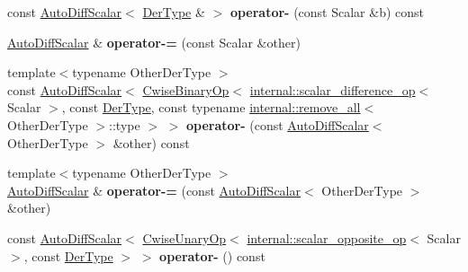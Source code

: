 \begin{DoxyCompactItemize}
\item 
\mbox{\label{class_eigen_1_1_auto_diff_scalar_aff9b4de98ff262aeabd2e965127ab348}} 
const \hyperlink{class_eigen_1_1_auto_diff_scalar}{Auto\+Diff\+Scalar}$<$ \hyperlink{group___sparse_core___module}{Der\+Type} \& $>$ {\bfseries operator-\/} (const Scalar \&b) const
\item 
\mbox{\label{class_eigen_1_1_auto_diff_scalar_a76603d0712d173a59f932237645142ad}} 
\hyperlink{class_eigen_1_1_auto_diff_scalar}{Auto\+Diff\+Scalar} \& {\bfseries operator-\/=} (const Scalar \&other)
\item 
\mbox{\label{class_eigen_1_1_auto_diff_scalar_ab27197e734ceb3cbcfb53f5685dd8ae2}} 
{\footnotesize template$<$typename Other\+Der\+Type $>$ }\\const \hyperlink{class_eigen_1_1_auto_diff_scalar}{Auto\+Diff\+Scalar}$<$ \hyperlink{group___core___module_class_eigen_1_1_cwise_binary_op}{Cwise\+Binary\+Op}$<$ \hyperlink{struct_eigen_1_1internal_1_1scalar__difference__op}{internal\+::scalar\+\_\+difference\+\_\+op}$<$ Scalar $>$, const \hyperlink{group___sparse_core___module}{Der\+Type}, const typename \hyperlink{struct_eigen_1_1internal_1_1remove__all}{internal\+::remove\+\_\+all}$<$ Other\+Der\+Type $>$\+::type $>$ $>$ {\bfseries operator-\/} (const \hyperlink{class_eigen_1_1_auto_diff_scalar}{Auto\+Diff\+Scalar}$<$ Other\+Der\+Type $>$ \&other) const
\item 
\mbox{\label{class_eigen_1_1_auto_diff_scalar_ae6739a142273ad4adab61aa118e74d9a}} 
{\footnotesize template$<$typename Other\+Der\+Type $>$ }\\\hyperlink{class_eigen_1_1_auto_diff_scalar}{Auto\+Diff\+Scalar} \& {\bfseries operator-\/=} (const \hyperlink{class_eigen_1_1_auto_diff_scalar}{Auto\+Diff\+Scalar}$<$ Other\+Der\+Type $>$ \&other)
\item 
\mbox{\label{class_eigen_1_1_auto_diff_scalar_af5057735847ea0948e92c08e1945ed02}} 
const \hyperlink{class_eigen_1_1_auto_diff_scalar}{Auto\+Diff\+Scalar}$<$ \hyperlink{group___core___module_class_eigen_1_1_cwise_unary_op}{Cwise\+Unary\+Op}$<$ \hyperlink{struct_eigen_1_1internal_1_1scalar__opposite__op}{internal\+::scalar\+\_\+opposite\+\_\+op}$<$ Scalar $>$, const \hyperlink{group___sparse_core___module}{Der\+Type} $>$ $>$ {\bfseries operator-\/} () const

\end{DoxyCompactItemize}
